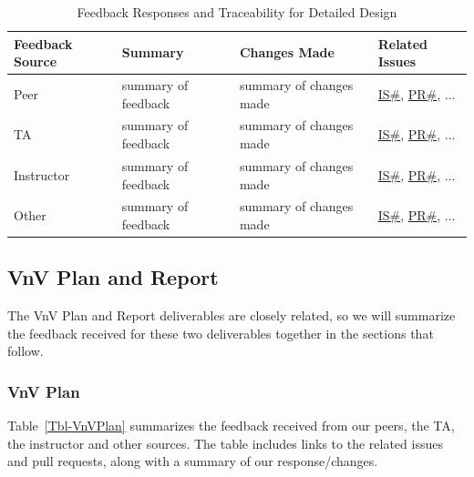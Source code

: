 \documentclass{article}
\begin{document}
\begin{longtable}{|p{2cm}|p{4cm}|p{5cm}|p{4cm}|}
\caption{Feedback Responses and Traceability for Detailed Design}
\label{Tbl-DetailedDesign}\\

\hline
\textbf{Feedback Source} & \textbf{Summary} & \textbf{Changes Made} & \textbf{Related Issues} \\ 
\hline
\endhead

Peer & summary of feedback & summary of changes made & \href{link}{IS\#}, \href{link}{PR\#}, ... \\
\hline
TA & summary of feedback & summary of changes made & \href{link}{IS\#}, \href{link}{PR\#}, ... \\
\hline
Instructor & summary of feedback & summary of changes made & \href{link}{IS\#}, \href{link}{PR\#}, ... \\
\hline
Other & summary of feedback & summary of changes made & \href{link}{IS\#}, \href{link}{PR\#}, ... \\
\hline
\end{longtable}

\subsection{VnV Plan and Report}

The VnV Plan and Report deliverables are closely related, so we will summarize
the feedback received for these two deliverables together in the sections that
follow.

\subsubsection{VnV Plan}
Table~\ref{Tbl-VnVPlan} summarizes the feedback received from our peers, the TA, the instructor and other sources.  The table includes links to the related issues and pull requests, along with a summary of our response/changes.
\end{document}
